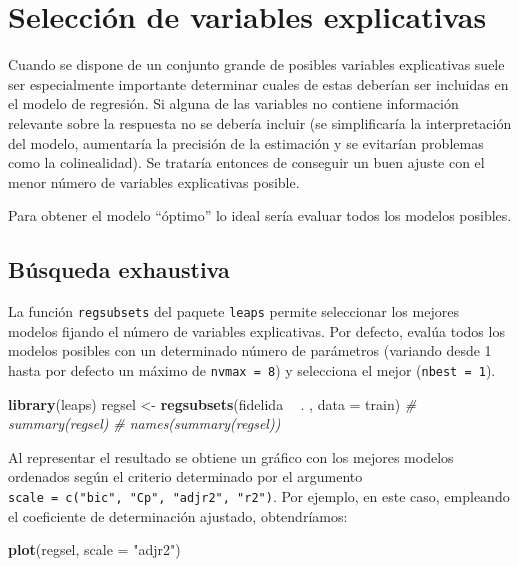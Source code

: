 \documentclass[
  spanish,
]{book}
\newenvironment{Shaded}{\begin{snugshade}}{\end{snugshade}}
\newcommand{\CommentTok}[1]{\textcolor[rgb]{0.56,0.35,0.01}{\textit{#1}}}
\newcommand{\DataTypeTok}[1]{\textcolor[rgb]{0.13,0.29,0.53}{#1}}
\newcommand{\KeywordTok}[1]{\textcolor[rgb]{0.13,0.29,0.53}{\textbf{#1}}}
\newcommand{\NormalTok}[1]{#1}
\newcommand{\OperatorTok}[1]{\textcolor[rgb]{0.81,0.36,0.00}{\textbf{#1}}}
\newcommand{\StringTok}[1]{\textcolor[rgb]{0.31,0.60,0.02}{#1}}
\theoremstyle{break}
\theoremstyle{definition}
\theoremstyle{definition}
\theoremstyle{definition}
\theoremstyle{remark}
\begin{document}
\hypertarget{seleccion-reg-lineal}{%
\section{Selección de variables explicativas}\label{seleccion-reg-lineal}}

Cuando se dispone de un conjunto grande de posibles variables explicativas
suele ser especialmente importante determinar cuales de estas deberían ser
incluidas en el modelo de regresión. Si alguna de las variables no contiene
información relevante sobre la respuesta no se debería incluir (se simplificaría
la interpretación del modelo, aumentaría la precisión de la estimación y se
evitarían problemas como la colinealidad). Se trataría entonces de conseguir
un buen ajuste con el menor número de variables explicativas posible.

Para obtener el modelo ``óptimo'' lo ideal sería evaluar todos los modelos posibles.

\hypertarget{buxfasqueda-exhaustiva}{%
\subsection{Búsqueda exhaustiva}\label{buxfasqueda-exhaustiva}}

La función \texttt{regsubsets} del paquete \texttt{leaps} permite seleccionar los mejores modelos
fijando el número de variables explicativas.
Por defecto, evalúa todos los modelos posibles con un determinado número de
parámetros (variando desde 1 hasta por defecto un máximo de \texttt{nvmax\ =\ 8})
y selecciona el mejor (\texttt{nbest\ =\ 1}).

\begin{Shaded}
\begin{Highlighting}[]
\KeywordTok{library}\NormalTok{(leaps)}
\NormalTok{regsel <-}\StringTok{ }\KeywordTok{regsubsets}\NormalTok{(fidelida }\OperatorTok{~}\StringTok{ }\NormalTok{. , }\DataTypeTok{data =}\NormalTok{ train)}
\CommentTok{# summary(regsel)}
\CommentTok{# names(summary(regsel))}
\end{Highlighting}
\end{Shaded}

Al representar el resultado se obtiene un gráfico con los mejores modelos ordenados
según el criterio determinado por el argumento \texttt{scale\ =\ c("bic",\ "Cp",\ "adjr2",\ "r2")}.
Por ejemplo, en este caso, empleando el coeficiente de determinación ajustado, obtendríamos:

\begin{Shaded}
\begin{Highlighting}[]
\KeywordTok{plot}\NormalTok{(regsel, }\DataTypeTok{scale =} \StringTok{"adjr2"}\NormalTok{)}
\end{Highlighting}
\end{Shaded}
\end{document}
